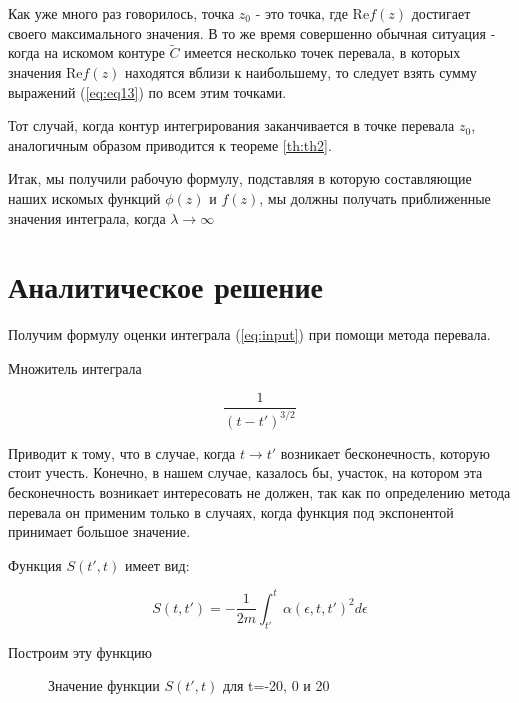 \documentclass[14pt]{extarticle}
\newcommand{\sectionbreak}{\clearpage}
\renewcommand{\Re}{\mathrm{Re}}
\renewcommand{\Re}{\mathrm{Re}}
\begin{document}
	Как уже много раз говорилось, точка $z_0$ - это точка, где $\Re f(z)$ достигает своего максимального значения. В то же время совершенно обычная ситуация - когда на искомом контуре $\widetilde{C}$ имеется несколько точек перевала, в которых значения $\Re f (z)$ находятся вблизи к наибольшему, то следует взять сумму выражений (\ref{eq:eq13}) по всем этим точками. 
	
	Тот случай, когда контур интегрирования заканчивается в точке перевала $z_0$, аналогичным образом приводится к теореме \ref{th:th2}.
	
	Итак, мы получили рабочую формулу, подставляя в которую составляющие наших искомых функций $\phi (z)$ и $f (z)$, мы должны получать приближенные значения интеграла, когда $\lambda \rightarrow \infty$ 

\sectionbreak

\section{Аналитическое решение}
Получим формулу оценки интеграла (\ref{eq:input}) при помощи метода перевала.

Множитель интеграла 

$$
\frac{1}{(t-t')^{3/2}}
$$

Приводит к тому, что в случае, когда $t \rightarrow t'$ возникает бесконечность, которую  стоит учесть. Конечно, в нашем случае, казалось бы, участок, на котором эта бесконечность возникает интересовать не должен, так как по определению метода перевала он применим только в случаях, когда функция под экспонентой принимает большое значение. 

Функция $S(t', t)$ имеет вид:

\begin{equation}\label{eq:S}
S(t, t') = -\frac{1}{2m}\int_{t'}^{t} \alpha(\epsilon, t, t')^2 d\epsilon
\end{equation}

Построим эту функцию 

\begin{figure}[h]
	\caption{Значение функции $S(t', t)$ для t=-20, 0 и 20}
	\label{ris:S}
\end{figure}
\end{document}
